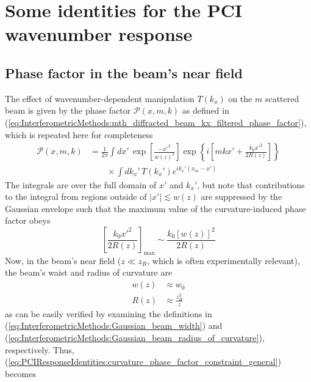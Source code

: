 \chapter{Some identities for the PCI wavenumber response}
\label{app:PCIResponseIdentities}


\section{Phase factor in the beam's near field}
The effect of wavenumber-dependent manipulation $T(k_x)$
on the $m$ scattered beam is given by
the phase factor $\mathcal{P}(x, m, k)$ as defined in
(\ref{eq:InterferometricMethods:mth_diffracted_beam_kx_filtered_phase_factor}),
which is repeated here for completeness
\begin{equation}
  \begin{aligned}
    \mathcal{P}(x, m, k)
    &=
    \frac{1}{2 \pi}
    \int dx' \,
    \exp\left[ \frac{-x'^2}{w(z)^2} \right]
    \exp\left\{%
      i \left[%
        m k x'
        +
        \frac{k_0 x'^2}{2 R(z)}
      \right]
    \right\}
    \\
    &\qquad \times
    \int dk_x' \,
    T(k_x')
    e^{i k_x' (x_m - x')}
  \end{aligned}
  \label{eq:PCIResponseIdentities:mth_diffracted_beam_kx_filtered_phase_factor_full}
\end{equation}
The integrals are over the full domain of $x'$ and $k_x'$, but
note that contributions to the integral
from regions outside of $|x'| \lesssim w(z)$
are suppressed by the Gaussian envelope such that
the maximum value of the curvature-induced phase factor obeys
\begin{equation}
  \left[ \frac{k_0 x'^2}{2 R(z)} \right]_{\text{max}}
  \sim
  \frac{k_0 [w(z)]^2}{2 R(z)}
  \label{eq:PCIResponseIdentities:curvature_phase_factor_constraint_general}
\end{equation}
Now, in the beam's near field
($z \ll z_R$, which is often experimentally relevant),
the beam's waist and radius of curvature are
\begin{align}
  w(z) &\approx w_0
  \\
  R(z) &\approx \frac{z_R^2}{z}
\end{align}
as can be easily verified by examining the definitions in
(\ref{eq:InterferometricMethods:Gaussian_beam_width}) and
(\ref{eq:InterferometricMethods:Gaussian_beam_radius_of_curvature}),
respectively.
Thus,
(\ref{eq:PCIResponseIdentities:curvature_phase_factor_constraint_general})
becomes
